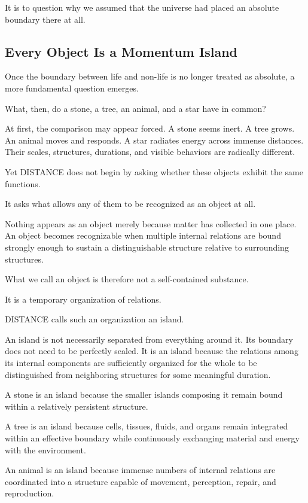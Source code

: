 It is to question why we assumed that the universe had placed an absolute boundary there at all.

\subsection*{\textbf{Every Object Is a Momentum Island}}

Once the boundary between life and non-life is no longer treated as absolute, a more fundamental question emerges.

What, then, do a stone, a tree, an animal, and a star have in common?

At first, the comparison may appear forced. A stone seems inert. A tree grows. An animal moves and responds. A star radiates energy across immense distances. Their scales, structures, durations, and visible behaviors are radically different.

Yet DISTANCE does not begin by asking whether these objects exhibit the same functions.

It asks what allows any of them to be recognized as an object at all.

Nothing appears as an object merely because matter has collected in one place. An object becomes recognizable when multiple internal relations are bound strongly enough to sustain a distinguishable structure relative to surrounding structures.

What we call an object is therefore not a self-contained substance.

It is a temporary organization of relations.

DISTANCE calls such an organization an island.

An island is not necessarily separated from everything around it. Its boundary does not need to be perfectly sealed. It is an island because the relations among its internal components are sufficiently organized for the whole to be distinguished from neighboring structures for some meaningful duration.

A stone is an island because the smaller islands composing it remain bound within a relatively persistent structure.

A tree is an island because cells, tissues, fluids, and organs remain integrated within an effective boundary while continuously exchanging material and energy with the environment.

An animal is an island because immense numbers of internal relations are coordinated into a structure capable of movement, perception, repair, and reproduction.

